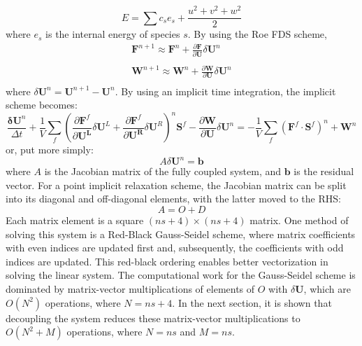 \begin{equation} E = \sum{c_s e_s}
   + \frac{u^2+v^2+w^2}{2} 
\end{equation}
where $e_s$ is the internal energy of species $s$.  By using the Roe FDS scheme,
\begin{equation}
	\begin{matrix}
		\mathbf{F}^{n+1} \approx \mathbf{F}^n+\frac{\partial \mathbf{F}}{\partial \mathbf{U}}\delta\mathbf{U}^n \\
		\\
		\mathbf{W}^{n+1} \approx \mathbf{W}^n+\frac{\partial \mathbf{W}}{\partial \mathbf{U}}\delta\mathbf{U}^n \\
	\end{matrix}
\end{equation}
%
where $\delta\mathbf{U}^n = \mathbf{U}^{n+1}- \mathbf{U}^{n}$.  By using an implicit time integration, the implicit scheme becomes:
%
\begin{equation}
	\frac{\mathbf{\delta U}^n}{\Delta t}+\frac{1}{V}\sum\limits_{f}(\frac{\partial \mathbf{F}^f}{\partial \mathbf{U^L}}\delta\mathbf{U}^L
	+\frac{\partial \mathbf{F}^f}{\partial \mathbf{U^R}}\delta\mathbf{U}^R)^n \mathbf{S}^f
	- \frac{\partial \mathbf{W}}{\partial \mathbf{U}}\delta\mathbf{U}^n
	= -\frac{1}{V}\sum\limits_{f}(\mathbf{F}^f\cdot\mathbf{S}^f)^n + \mathbf{W}^n
\end {equation}
%
or, put more simply:
%
\begin{equation}
	A\delta\mathbf{U}^n = \mathbf{b}
\end{equation}
%
where $A$ is the Jacobian matrix of the fully coupled system, and $\mathbf{b}$
is the residual vector.  For a point implicit relaxation scheme, the Jacobian
matrix can be split into its diagonal and off-diagonal elements, with the latter
moved to the RHS:
%
\begin{equation}
\label{decomp_jac}
	A=O+D
\end{equation}
%
Each matrix element is a square $(ns+4)\times(ns+4)$ matrix.  One method of
solving this system is a Red-Black Gauss-Seidel scheme\cite{red-black}, where matrix
coefficients with even indices are updated first and, subsequently, the
coefficients with odd indices are updated.  This red-black ordering enables
better vectorization in solving the linear system.  The computational work for
the Gauss-Seidel scheme is dominated by matrix-vector multiplications of
elements of $O$ with $\delta\mathbf{U}$, which are $O(N^2)$ operations, where
$N=ns+4$.  In the next section, it is shown that decoupling the system reduces
these matrix-vector multiplications to $O(N^2 + M)$ operations, where $N=ns$ and
$M=ns$.

